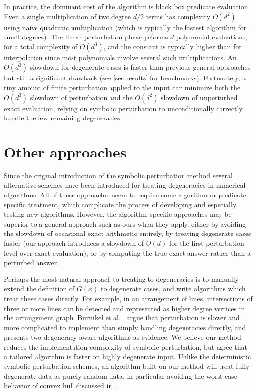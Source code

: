 \documentclass[11pt]{article}
\begin{document}
In practice, the dominant cost of the algorithm is black box predicate evaluation.  Even a single multiplication of two degree $d/2$ terms has complexity $O(d^2)$ using naive
quadratic multiplication (which is typically the fastest algorithm for small degrees).  The linear perturbation phase peforms $d$ polynomial evaluations, for a total
complexity of $O(d^3)$, and the constant is typically higher than for interpolation since most polynomials involve several such multiplications.  An $O(d^3)$ slowdown for degenerate
cases is faster than previous general approaches but still a significant drawback (see \autoref{sec:results} for benchmarks).  Fortunately, a tiny amount of finite perturbation
applied to the input can minimize both the $O(d^3)$ slowdown of perturbation and the $O(d^2)$ slowdown of unperturbed exact evaluation, relying on symbolic perturbation to
unconditionally correctly handle the few remaining degeneracies.

\section{Other approaches}

Since the original introduction of the symbolic perturbation method several alternative schemes have been introduced for treating degeneracies in numerical algorithms.
All of these approaches seem to require some algorithm or predicate specific treatment, which complicate the process of developing and especially testing new algorithms.
However, the algorithm specific approaches may be superior to a general approach such as ours when they apply, either by avoiding the slowdown of occasional exact arithmetic
entirely, by treating degenerate cases faster (our approach introduces a slowdown of $O(d)$ for the first perturbation level over exact evaluation), or by computing the true exact
answer rather than a perturbed answer.

Perhaps the most natural approach to treating to degeneracies is to manually extend the definition of $G(x)$ to degenerate cases, and write algorithms which treat these cases
directly.  For example, in an arrangement of lines, intersections of three or more lines can be detected and represented as higher degree vertices in the arrangement graph.
Burnikel et al.\ \cite{burnikel1994degeneracy} argue that perturbation is slower and more complicated to implement than simply handling degeneracies directly, and presents two degeneracy-aware
algorithms as evidence.  We believe our method reduces the implementation complexity of symbolic perturbation, but agree that a tailored algorithm is faster on highly
degenerate input.  Unlike the deterministic symbolic perturbation schemes, an algorithm built on our method will treat fully degenerate data as purely random data, in particular
avoiding the worst case behavior of convex hull discussed in \cite{burnikel1994degeneracy}.
\end{document}
